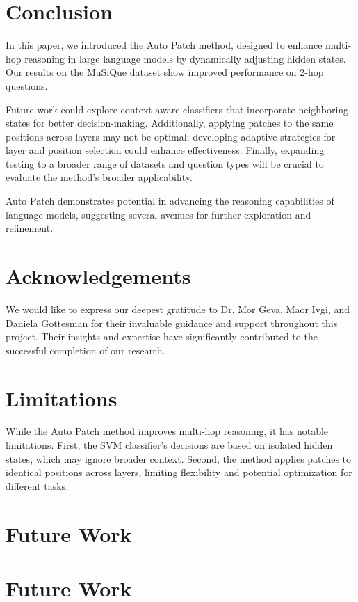 \documentclass[11pt]{article}
\begin{document}
\section{Conclusion}
In this paper, we introduced the Auto Patch method, designed to enhance multi-hop reasoning in large language models by dynamically adjusting hidden states. Our results on the MuSiQue dataset show improved performance on 2-hop questions.

Future work could explore context-aware classifiers that incorporate neighboring states for better decision-making. Additionally, applying patches to the same positions across layers may not be optimal; developing adaptive strategies for layer and position selection could enhance effectiveness. Finally, expanding testing to a broader range of datasets and question types will be crucial to evaluate the method’s broader applicability.

Auto Patch demonstrates potential in advancing the reasoning capabilities of language models, suggesting several avenues for further exploration and refinement.


\section*{Acknowledgements}

We would like to express our deepest gratitude to Dr. Mor Geva, Maor Ivgi, and Daniela Gottesman for their invaluable guidance and support throughout this project. Their insights and expertise have significantly contributed to the successful completion of our research.

\section*{Limitations}
While the Auto Patch method improves multi-hop reasoning, it has notable limitations. First, the SVM classifier's decisions are based on isolated hidden states, which may ignore broader context. Second, the method applies patches to identical positions across layers, limiting flexibility and potential optimization for different tasks.

\section*{Future Work}
\section{Future Work}
\end{document}
